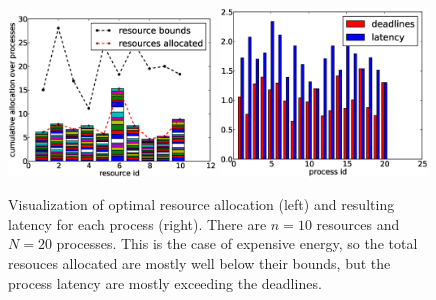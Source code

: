 \begin{figure}[th]
\centering
\includegraphics[width=0.49\textwidth]{figures/test_resource_e.eps}
\includegraphics[width=0.49\textwidth]{figures/test_latency_e.eps}
\caption{Visualization of optimal resource allocation (left) and 
    resulting latency for each process (right).
    There are $n=10$ resources and $N=20$ processes.
    This is the case of expensive energy, so the total resouces allocated
    are mostly well below their bounds, but the process latency are mostly
exceeding the deadlines.}
\label{fig:allocation-e}
\end{figure}


